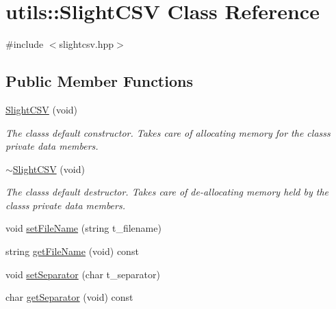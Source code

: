 \hypertarget{classutils_1_1SlightCSV}{}\section{utils\+:\+:Slight\+C\+SV Class Reference}
\label{classutils_1_1SlightCSV}


{\ttfamily \#include $<$slightcsv.\+hpp$>$}

\subsection*{Public Member Functions}
\begin{DoxyCompactItemize}
\item 
\mbox{\label{classutils_1_1SlightCSV_a9f30e030dd5eff9f7df564c9cd7a81e8}} 
\hyperlink{classutils_1_1SlightCSV_a9f30e030dd5eff9f7df564c9cd7a81e8}{Slight\+C\+SV} (void)
\begin{DoxyCompactList}\small\item\em The class\textquotesingle{}s default constructor. Takes care of allocating memory for the class\textquotesingle{}s private data members. \end{DoxyCompactList}\item 
\mbox{\label{classutils_1_1SlightCSV_abeb9790f681d93c6f8a8ba210678565b}} 
\hyperlink{classutils_1_1SlightCSV_abeb9790f681d93c6f8a8ba210678565b}{$\sim$\+Slight\+C\+SV} (void)
\begin{DoxyCompactList}\small\item\em The class\textquotesingle{}s default destructor. Takes care of de-\/allocating memory held by the class\textquotesingle{}s private data members. \end{DoxyCompactList}\item 
void \hyperlink{classutils_1_1SlightCSV_a9567504e450440a9564053c8ab6f6ff9}{set\+File\+Name} (string t\+\_\+filename)
\item 
string \hyperlink{classutils_1_1SlightCSV_ad689937346e0d6dd37597e7c3458e164}{get\+File\+Name} (void) const
\item 
void \hyperlink{classutils_1_1SlightCSV_ab8cb026f9b404ef76e62eae60aecb999}{set\+Separator} (char t\+\_\+separator)
\item 
char \hyperlink{classutils_1_1SlightCSV_a72cb5e6333d648ef09fdf556d7baf15e}{get\+Separator} (void) const
\item 

\end{DoxyCompactItemize}

